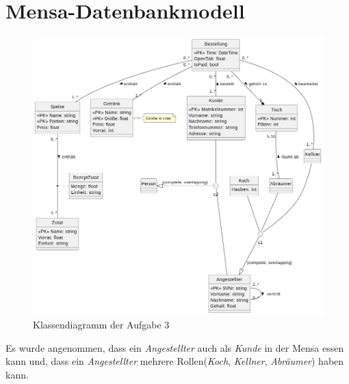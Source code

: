 \documentclass[12pt]{scrartcl}
\begin{document}
\section{Mensa-Datenbankmodell}
\begin{figure}
    \centering
    \includegraphics[width=0.9\linewidth]{../UE1_3.png}
    \caption{Klassendiagramm der Aufgabe 3}
\end{figure}

Es wurde angenommen, dass ein \emph{Angestellter} auch als \emph{Kunde} in der Mensa essen kann und,
dass ein \emph{Angestellter} mehrere Rollen(\emph{Koch}, \emph{Kellner}, \emph{Abräumer}) haben kann.
\end{document}
